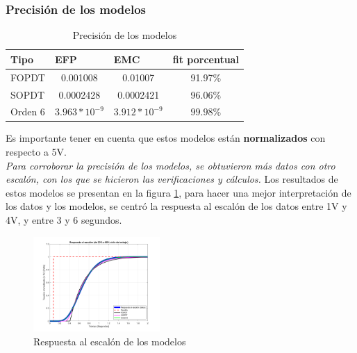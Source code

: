 \documentclass[letterpaper, 10 pt, conference]{ieeeconf}  %
\begin{document}
\vspace{1em}

\subsubsection{Precisión de los modelos}


\begin{table}[H]
\centering
\begin{tabular}{|l|c|c|c|}
\hline
\textbf{Tipo} & \multicolumn{1}{l|}{\textbf{EFP}}     & \multicolumn{1}{l|}{\textbf{EMC}}     & \multicolumn{1}{l|}{\textbf{fit porcentual}} \\ \hline
FOPDT   & 0.001008                     & 0.01007                      & 91.97\%                             \\ \hline
SOPDT   & 0.0002428                    & 0.0002421                    & 96.06\%                             \\ \hline
Orden 6 & $3.963*10^{-9}$ & $3.912*10^{-9}$ & $99.98\%$                             \\ \hline
\end{tabular}
  \caption{Precisión de los modelos}
  \label{tab:precision_modelos}
\end{table}

Es importante tener en cuenta que estos modelos están \textbf{normalizados} con respecto a 5V. \\

\textit{Para corroborar la precisión de los modelos, se obtuvieron más datos con otro escalón, con los que se hicieron las verificaciones y cálculos.}
Los resultados de estos modelos se presentan en la figura \ref{fig:resp_esc_modelos}, para hacer una mejor interpretación de los datos y los modelos, se centró la respuesta al escalón de los datos entre 1V y 4V, y entre 3 y 6 segundos.

\begin{figure}[H]
  \centering
  \includegraphics[width=0.43\textwidth]{./IMAGENES/resp_esc.png}
  \caption{Respuesta al escalón de los modelos}
  \label{fig:resp_esc_modelos}
\end{figure}
\end{document}
